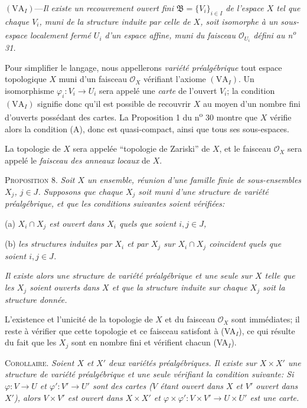 $(\mathrm{VA}_I)$---\textit{Il existe un recouvrement ouvert fini $\mathfrak{B} = \{V_i\}_{i \in I}$ de l'espace $X$ tel que chaque $V_i$, muni de la structure induite par celle de $X$, soit isomorphe à un sous-espace localement fermé $U_i$ d'un espace affine, muni du faisceau $\mathcal{O}_{U_i}$ défini au n\textsuperscript{o} 31.}

Pour simplifier le langage, nous appellerons \textit{variété préalgébrique} tout espace topologique $X$ muni d'un faisceau $\mathcal{O}_X$ vérifiant l'axiome $(\mathrm{VA}_I)$. Un isomorphisme $\varphi_i\colon V_i \to U_i$ sera appelé une \textit{carte} de l'ouvert $V_i$; la condition $(\mathrm{VA}_I)$ signifie donc qu'il est possible de recouvrir $X$ au moyen d'un nombre fini d'ouverts possédant des cartes. La Proposition 1 du n\textsuperscript{o} 30 montre que $X$ vérifie alors la condition (A), donc est quasi-compact, ainsi que tous ses sous-espaces.



La topologie de $X$ sera appelée ``topologie de Zariski'' de $X$, et le faisceau $\mathcal{O}_X$ sera appelé le \textit{faisceau des anneaux locaux} de $X$.

\textsc{Proposition} 8. \textit{Soit $X$ un ensemble, réunion d'une famille finie de sous-ensembles $X_j$, $j \in J$. Supposons que chaque $X_j$ soit muni d'une structure de variété préalgébrique, et que les conditions suivantes soient vérifiées:}

(a) \textit{$X_i \cap X_j$ est ouvert dans $X_i$ quels que soient $i, j \in J$,}

(b) \textit{les structures induites par $X_i$ et par $X_j$ sur $X_i \cap X_j$ coincident quels que soient $i, j \in J$.}

\textit{Il existe alors une structure de variété préalgébrique et une seule sur $X$ telle que les $X_j$ soient ouverts dans $X$ et que la structure induite sur chaque $X_j$ soit la structure donnée.}

L'existence et l'unicité de la topologie de $X$ et du faisceau $\mathcal{O}_X$ sont immédiates; il reste à vérifier que cette topologie et ce faisceau satisfont à (VA$_I$), ce qui résulte du fait que les $X_j$ sont en nombre fini et vérifient chacun (VA$_I$).

\textsc{Corollaire}. \textit{Soient $X$ et $X'$ deux variétés préalgébriques. Il existe sur $X \times X'$ une structure de variété préalgébrique et une seule vérifiant la condition suivante: Si $\varphi : V \to U$ et $\varphi' : V' \to U'$ sont des cartes ($V$ étant ouvert dans $X$ et $V'$ ouvert dans $X'$), alors $V \times V'$ est ouvert dans $X \times X'$ et $\varphi \times \varphi' : V \times V' \to U \times U'$ est une carte.}

